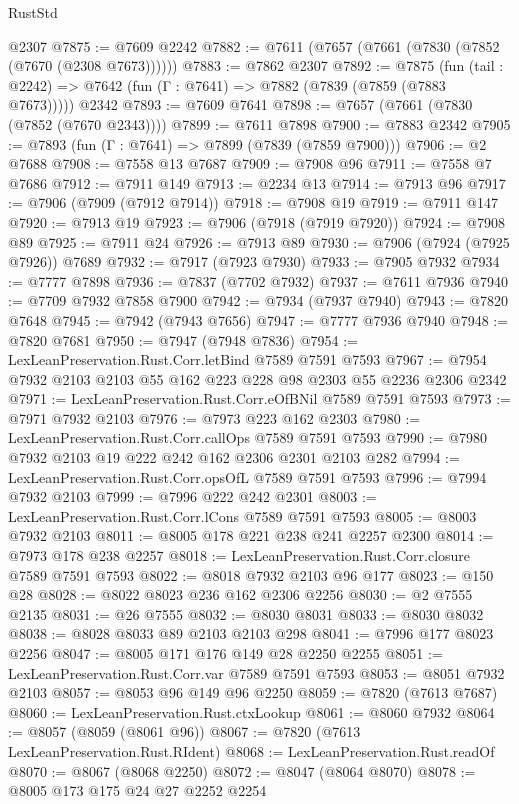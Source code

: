 \begin{lexlean}{RustStd}
\begin{coremodule}
    @2307
@7875 := @7609 @2242
@7882 := @7611 (@7657 (@7661 (@7830 (@7852 (@7670 (@2308 @7673))))))
@7883 := @7862 @2307
@7892 := @7875
    (fun (tail : @2242) => @7642 (fun (Γ : @7641) => @7882 (@7839 (@7859 (@7883 @7673)))))
    @2342
@7893 := @7609 @7641
@7898 := @7657 (@7661 (@7830 (@7852 (@7670 @2343))))
@7899 := @7611 @7898
@7900 := @7883 @2342
@7905 := @7893 (fun (Γ : @7641) => @7899 (@7839 (@7859 @7900)))
@7906 := @2 @7688
@7908 := @7558 @13 @7687
@7909 := @7908 @96
@7911 := @7558 @7 @7686
@7912 := @7911 @149
@7913 := @2234 @13
@7914 := @7913 @96
@7917 := @7906 (@7909 (@7912 @7914))
@7918 := @7908 @19
@7919 := @7911 @147
@7920 := @7913 @19
@7923 := @7906 (@7918 (@7919 @7920))
@7924 := @7908 @89
@7925 := @7911 @24
@7926 := @7913 @89
@7930 := @7906 (@7924 (@7925 @7926)) @7689
@7932 := @7917 (@7923 @7930)
@7933 := @7905 @7932
@7934 := @7777 @7898
@7936 := @7837 (@7702 @7932)
@7937 := @7611 @7936
@7940 := @7709 @7932 @7858 @7900
@7942 := @7934 (@7937 @7940)
@7943 := @7820 @7648
@7945 := @7942 (@7943 @7656)
@7947 := @7777 @7936 @7940
@7948 := @7820 @7681
@7950 := @7947 (@7948 @7836)
@7954 := LexLeanPreservation.Rust.Corr.letBind @7589 @7591 @7593
@7967 := @7954 @7932 @2103 @2103 @55 @162 @223 @228 @98 @2303 @55 @2236 @2306 @2342
@7971 := LexLeanPreservation.Rust.Corr.eOfBNil @7589 @7591 @7593
@7973 := @7971 @7932 @2103
@7976 := @7973 @223 @162 @2303
@7980 := LexLeanPreservation.Rust.Corr.callOps @7589 @7591 @7593
@7990 := @7980 @7932 @2103 @19 @222 @242 @162 @2306 @2301 @2103 @282
@7994 := LexLeanPreservation.Rust.Corr.opsOfL @7589 @7591 @7593
@7996 := @7994 @7932 @2103
@7999 := @7996 @222 @242 @2301
@8003 := LexLeanPreservation.Rust.Corr.lCons @7589 @7591 @7593
@8005 := @8003 @7932 @2103
@8011 := @8005 @178 @221 @238 @241 @2257 @2300
@8014 := @7973 @178 @238 @2257
@8018 := LexLeanPreservation.Rust.Corr.closure @7589 @7591 @7593
@8022 := @8018 @7932 @2103 @96 @177
@8023 := @150 @28
@8028 := @8022 @8023 @236 @162 @2306 @2256
@8030 := @2 @7555 @2135
@8031 := @26 @7555
@8032 := @8030 @8031
@8033 := @8030 @8032
@8038 := @8028 @8033 @89 @2103 @2103 @298
@8041 := @7996 @177 @8023 @2256
@8047 := @8005 @171 @176 @149 @28 @2250 @2255
@8051 := LexLeanPreservation.Rust.Corr.var @7589 @7591 @7593
@8053 := @8051 @7932 @2103
@8057 := @8053 @96 @149 @96 @2250
@8059 := @7820 (@7613 @7687)
@8060 := LexLeanPreservation.Rust.ctxLookup
@8061 := @8060 @7932
@8064 := @8057 (@8059 (@8061 @96))
@8067 := @7820 (@7613 LexLeanPreservation.Rust.RIdent)
@8068 := LexLeanPreservation.Rust.readOf
@8070 := @8067 (@8068 @2250)
@8072 := @8047 (@8064 @8070)
@8078 := @8005 @173 @175 @24 @27 @2252 @2254

\end{coremodule}
\end{lexlean}
